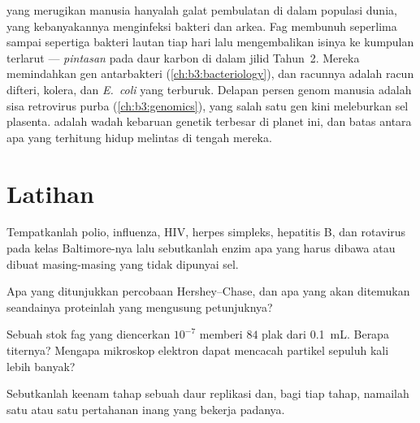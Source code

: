 \begin{remark}\label{rem:b3:virology:economy}
 yang merugikan manusia hanyalah galat pembulatan di dalam populasi 
dunia, yang kebanyakannya menginfeksi bakteri dan arkea. Fag membunuh
seperlima sampai sepertiga bakteri lautan tiap hari lalu mengembalikan isinya
ke kumpulan terlarut --- \emph{pintasan } pada daur karbon di dalam jilid
Tahun~2. Mereka memindahkan gen antarbakteri
(\cref{ch:b3:bacteriology}), dan racunnya adalah racun
difteri, kolera, dan \emph{E.~coli} yang terburuk. Delapan persen genom
manusia adalah sisa retrovirus purba
(\cref{ch:b3:genomics}), yang salah satu gen  kini meleburkan
sel plasenta.  adalah wadah kebaruan genetik terbesar
di planet ini, dan batas antara apa yang terhitung hidup melintas
di tengah mereka.
\end{remark}

\section{Latihan}

\begin{exercise}[$\star$]\label{exo:b3:virology:1}
Tempatkanlah polio, influenza, HIV, herpes simpleks, hepatitis B, dan rotavirus
pada kelas Baltimore-nya lalu sebutkanlah enzim apa yang harus dibawa atau
dibuat masing-masing yang tidak dipunyai sel.
\end{exercise}

\begin{exercise}[$\star$]\label{exo:b3:virology:2}
Apa yang ditunjukkan percobaan Hershey--Chase, dan apa yang akan ditemukan
seandainya proteinlah yang mengusung petunjuknya?
\end{exercise}

\begin{exercise}[$\star$]\label{exo:b3:virology:3}
Sebuah stok fag yang diencerkan $10^{-7}$ memberi $84$ plak dari \qty{0.1}{mL}.
Berapa titernya? Mengapa mikroskop elektron dapat mencacah partikel sepuluh
kali lebih banyak?
\end{exercise}

\begin{exercise}[$\star$]\label{exo:b3:virology:4}
Sebutkanlah keenam tahap sebuah daur replikasi dan, bagi tiap tahap, namailah
satu  atau satu pertahanan inang yang bekerja padanya.
\end{exercise}

